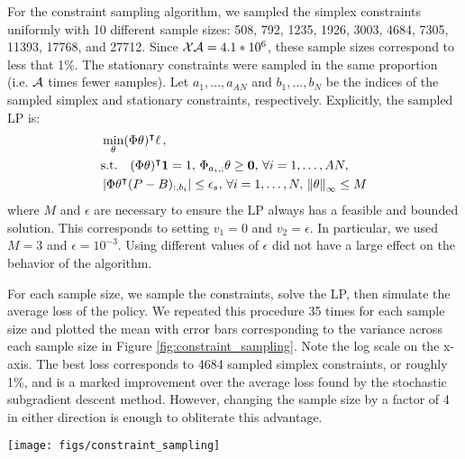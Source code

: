 \documentclass[11pt]{article}
\begin{document}
For the constraint sampling algorithm, we sampled the simplex constraints uniformly  with 10 different sample sizes: 508, 792, 1235, 1926, 3003, 4684, 7305, 11393, 17768, and 27712. Since ${\cal X}{\cal A}=4.1*10^6$, these sample sizes correspond to less that 1\%. The stationary constraints were sampled in the same proportion (i.e. ${\cal A}$ times fewer samples). Let $a_1,\ldots,a_{AN}$ and $b_1,\ldots,b_N$ be the indices of the sampled simplex and stationary constraints, respectively. Explicitly, the sampled LP is:
\begin{align}
\label{eq:sampled_LP}
&\min_{\theta} (\Phi \theta)^\intercal  \ell\,, \\
\notag
&\mbox{s.t.}\quad (\Phi\theta)^\intercal  \mathbf 1 = 1,\, \Phi_{a_i,;} \theta \geq \mathbf 0,\, \forall i=1,\ldots,AN,\\
&\left\vert\Phi\theta^\intercal (P - B)_{:,b_i}\right\vert \leq \mathbf \epsilon_s,\, \forall i=1,\ldots,N,\, \left\Vert\theta\right\Vert_\infty\leq M
\end{align}
where $M$ and $\epsilon$ are necessary to ensure the LP always has a feasible  and bounded solution. This corresponds to setting $v_1=0$ and $v_2=\epsilon$. In particular, we used $M=3$ and $\epsilon=10^{-3}$. Using different values of $\epsilon$ did not have a large effect on the behavior of the algorithm.

For each sample size, we sample the constraints, solve the LP, then simulate the average loss of the policy. We repeated this procedure 35 times for each sample size and plotted the mean with error bars corresponding to the variance across each sample size in Figure \ref{fig:constraint_sampling}. Note the log scale on the x-axis. The best loss corresponds to 4684 sampled simplex constraints, or roughly 1\%, and is a marked improvement over the average loss found by the stochastic subgradient descent method. However, changing the sample size by a factor of 4 in either direction is enough to obliterate this advantage.
\begin{figure*}[h]
\centering
\label{fig:constraint_sampling}
\texttt{[image: figs/constraint\_sampling]}
\caption{Average loss with variance error bars of the constraint sampling algorithm run with a variety of sample sizes.}
\end{figure*}
\end{document}
